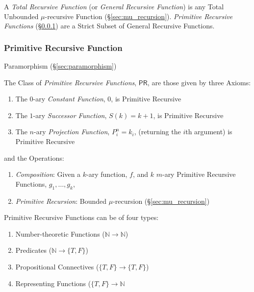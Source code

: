 A \emph{Total Recursive Function} (or \emph{General Recursive
  Function}) is any Total Unbounded $\mu$-recursive Function
(\S\ref{sec:mu_recursion}). \emph{Primitive Recursive Functions}
(\S\ref{sec:primitive_recursive}) are a Strict Subset of General
Recursive Functions.



\subsubsection{Primitive Recursive Function}
\label{sec:primitive_recursive}

Paramorphism (\S\ref{sec:paramorphism})

The Class of \emph{Primitive Recursive Functions}, $\mathsf{PR}$, are
those given by three Axioms:
\begin{enumerate}
  \item The $0$-ary \emph{Constant Function}, $0$, is Primitive
    Recursive
  \item The $1$-ary \emph{Successor Function}, $S(k) = k + 1$, is
    Primitive Recursive
  \item The $n$-ary \emph{Projection Function}, $P_i^n = k_i$,
    (returning the $i$th argument) is Primitive Recursive
\end{enumerate}
and the Operations:
\begin{enumerate}
  \item \emph{Composition}: Given a $k$-ary function, $f$, and $k$
    $m$-ary Primitive Recursive Functions, $g_1, \ldots, g_k$,
  \item \emph{Primitive Recursion}: Bounded $\mu$-recursion
    (\S\ref{sec:mu_recursion})
\end{enumerate}

Primitive Recursive Functions can be of four types: \cite{kleene52}

\begin{enumerate}
\item Number-theoretic Functions ($\mathbb{N} \rightarrow \mathbb{N}$)
\item Predicates ($\mathbb{N} \rightarrow \{T,F\}$)
\item Propositional Connectives ($\{T,F\} \rightarrow \{T,F\}$)
\item Representing Functions ($\{T,F\} \rightarrow \mathbb{N}$
\end{enumerate}



